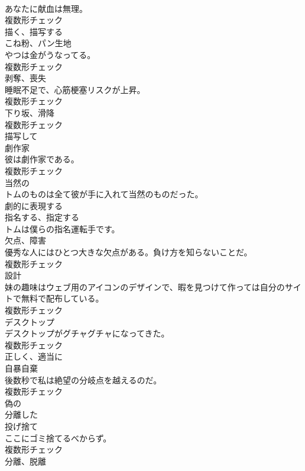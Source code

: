 \documentclass[8pt]{extreport}
\begin{document}
\begin{CJK}{UTF8}{min}
\\	あなたに献血は無理。	
\\	複数形チェック
\\	[動詞]	描く、描写する	
\\	[名詞]	こね粉、パン生地	
\\	やつは金がうなってる。	
\\	複数形チェック
\\	[名詞]	剥奪、喪失	
\\	睡眠不足で、心筋梗塞リスクが上昇。	
\\	複数形チェック
\\	[名詞]	下り坂、滑降	
\\	複数形チェック
\\	[形容詞]	描写して	
\\	[名詞]	劇作家	
\\	彼は劇作家である。	
\\	複数形チェック
\\	[形容詞]	当然の	
\\	トムのものは全て彼が手に入れて当然のものだった。	
\\	[動詞]	劇的に表現する	
\\	[動詞]	指名する、指定する	
\\	トムは僕らの指名運転手です。	
\\	[名詞]	欠点、障害	
\\	優秀な人にはひとつ大きな欠点がある。負け方を知らないことだ。	
\\	複数形チェック
\\	[名詞]	設計	
\\	妹の趣味はウェブ用のアイコンのデザインで、暇を見つけて作っては自分のサイトで無料で配布している。	
\\	複数形チェック
\\	[名詞]	デスクトップ	
\\	デスクトップがグチャグチャになってきた。	
\\	複数形チェック
\\	[副詞]	正しく、適当に	
\\	[名詞]	自暴自棄	
\\	後数秒で私は絶望の分岐点を越えるのだ。	
\\	複数形チェック
\\	[形容詞]	偽の	
\\	[形容詞]	分離した	
\\	[名詞]	投げ捨て	
\\	ここにゴミ捨てるべからず。	
\\	複数形チェック
\\	[名詞]	分離、脱離	

\end{CJK}
\end{document}
